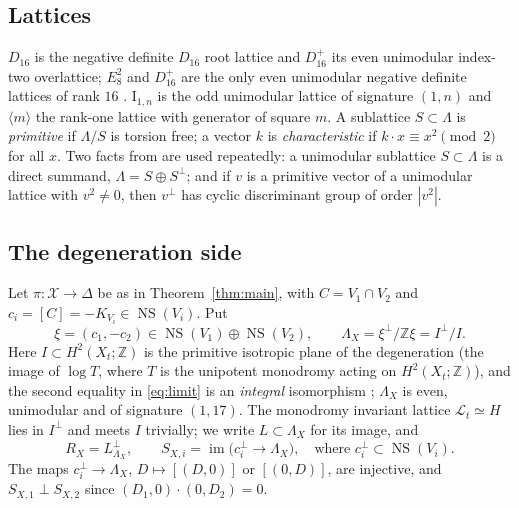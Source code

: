 \documentclass[11pt]{article}
\newcommand{\Z}{\mathbb Z}
\newcommand{\NS}{\operatorname{NS}}
\newcommand{\im}{\operatorname{im}}
\newcommand{\calX}{\mathcal X}
\newcommand{\calL}{\mathcal L}
\newcommand{\I}{\mathrm{I}}
\theoremstyle{definition}
\theoremstyle{remark}
\begin{document}
\subsection{Lattices}

\(D_{16}\) is the negative definite \(D_{16}\) root lattice and
\(D_{16}^+\) its even unimodular index-two overlattice; \(E_8^2\) and
\(D_{16}^+\) are the only even unimodular negative definite lattices of
rank \(16\) \cite[\S8]{Se}. \(\I_{1,n}\) is the odd unimodular lattice
of signature \((1,n)\) and \(\langle m\rangle\) the rank-one lattice
with generator of square \(m\). A sublattice \(S\subset\Lambda\) is
\emph{primitive} if \(\Lambda/S\) is torsion free; a vector \(k\) is
\emph{characteristic} if \(k\cdot x\equiv x^2\pmod 2\) for all \(x\).
Two facts from \cite{Ni} are used repeatedly: a unimodular sublattice
\(S\subset\Lambda\) is a direct summand, \(\Lambda=S\oplus S^\perp\);
and if \(v\) is a primitive vector of a unimodular lattice with
\(v^2\neq0\), then \(v^\perp\) has cyclic discriminant group of order
\(|v^2|\).

\subsection{The degeneration side}\label{sec:degside}

Let \(\pi\colon\calX\to\Delta\) be as in Theorem~\ref{thm:main}, with
\(C=V_1\cap V_2\) and \(c_i=[C]=-K_{V_i}\in\NS(V_i)\). Put
\begin{equation}\label{eq:limit}
 \xi=(c_1,-c_2)\in\NS(V_1)\oplus\NS(V_2),\qquad
 \Lambda_X=\xi^\perp/\Z\xi=I^\perp/I .
\end{equation}
Here \(I\subset H^2(X_t;\Z)\) is the primitive isotropic plane of the
degeneration (the image of \(\log T\), where \(T\) is the unipotent
monodromy acting on \(H^2(X_t;\Z)\)), and the second equality in \eqref{eq:limit} is an
\emph{integral} isomorphism \cite[Proposition~3.5]{GT}; \(\Lambda_X\)
is even, unimodular and of signature \((1,17)\). The monodromy
invariant lattice \(\calL_t\simeq H\) lies in \(I^\perp\) and meets
\(I\) trivially; we write \(L\subset\Lambda_X\) for its image, and
\begin{equation}\label{eq:SX}
 R_X=L^\perp_{\Lambda_X},\qquad
 S_{X,i}=\im\bigl(c_i^\perp\longrightarrow\Lambda_X\bigr),
 \quad\text{where } c_i^\perp\subset\NS(V_i).
\end{equation}
The maps \(c_i^\perp\to\Lambda_X\), \(D\mapsto[(D,0)]\) or
\([(0,D)]\), are injective, and \(S_{X,1}\perp S_{X,2}\) since
\((D_1,0)\cdot(0,D_2)=0\).
\end{document}

